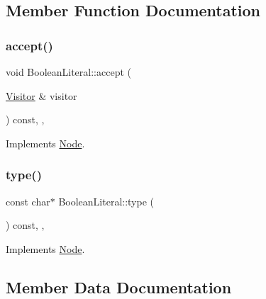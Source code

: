 \subsection{Member Function Documentation}
\mbox{\label{struct_boolean_literal_aeb7a30e2b22ac6ad12723da1e72087c5}} 
\subsubsection{\texorpdfstring{accept()}{accept()}}
{\footnotesize\ttfamily void Boolean\+Literal\+::accept (\begin{DoxyParamCaption}\item[{\hyperlink{struct_visitor}{Visitor} \&}]{visitor }\end{DoxyParamCaption}) const\hspace{0.3cm}{\ttfamily [inline]}, {\ttfamily [override]}, {\ttfamily [virtual]}}



Implements \hyperlink{struct_node_a10bd7af968140bbf5fa461298a969c71}{Node}.

\mbox{\label{struct_boolean_literal_aa10a3ecbeefe15607c3ac43ed63ba8da}} 
\subsubsection{\texorpdfstring{type()}{type()}}
{\footnotesize\ttfamily const char$\ast$ Boolean\+Literal\+::type (\begin{DoxyParamCaption}{ }\end{DoxyParamCaption}) const\hspace{0.3cm}{\ttfamily [inline]}, {\ttfamily [override]}, {\ttfamily [virtual]}}



Implements \hyperlink{struct_node_a82f29420d0a38efcc370352528e94e9b}{Node}.



\subsection{Member Data Documentation}
\mbox{\label{struct_boolean_literal_af74f8eba8c2ea30656de4c4919f5778d}} 
